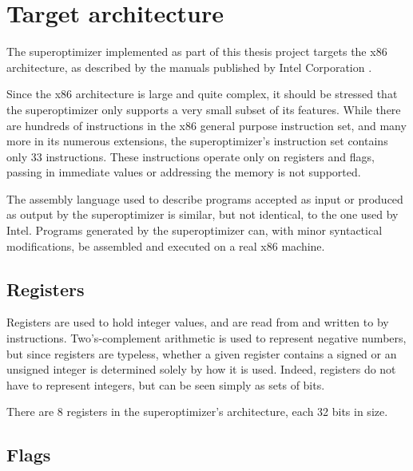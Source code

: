 \documentclass[a4paper,11pt]{kth-mag}
\begin{document}
\chapter{Target architecture}
\label{ch:target_architecture}

The superoptimizer implemented as part of this thesis project targets the x86 architecture, as described by the manuals published by Intel Corporation \cite{intel_1,intel_2a,intel_2b}.

Since the x86 architecture is large and quite complex, it should be stressed that the superoptimizer only supports a very small subset of its features.
While there are hundreds of instructions in the x86 general purpose instruction set, and many more in its numerous extensions, the superoptimizer's instruction set contains only 33 instructions.
These instructions operate only on registers and flags, passing in immediate values or addressing the memory is not supported.


The assembly language used to describe programs accepted as input or produced as output by the superoptimizer is similar, but not identical, to the one used by Intel.
Programs generated by the superoptimizer can, with minor syntactical modifications, be assembled and executed on a real x86 machine.


\section{Registers}

Registers are used to hold integer values, and are read from and written to by instructions.
Two's-complement arithmetic is used to represent negative numbers, but since registers are typeless, whether a given register contains a signed or an unsigned integer is determined solely by how it is used.
Indeed, registers do not have to represent integers, but can be seen simply as sets of bits.

There are 8 registers in the superoptimizer's architecture, each 32 bits in size.

\section{Flags}
\label{s:flags}
\end{document}
